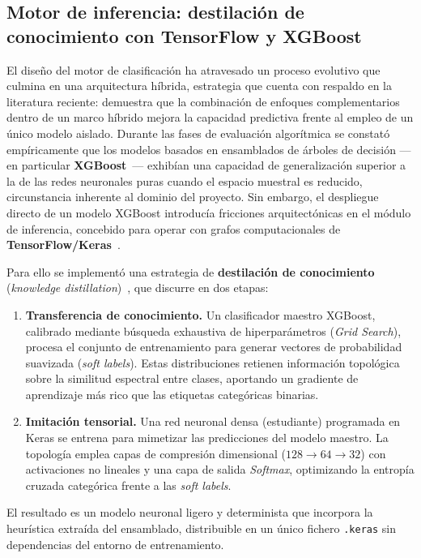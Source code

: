 \subsection{Motor de inferencia: destilación de conocimiento con TensorFlow y XGBoost}

El diseño del motor de clasificación ha atravesado un proceso evolutivo que
culmina en una arquitectura híbrida, estrategia que cuenta con respaldo en la
literatura reciente: \cite{kashani:2025} demuestra que la combinación de
enfoques complementarios dentro de un marco híbrido mejora la capacidad
predictiva frente al empleo de un único modelo aislado. Durante las fases de
evaluación algorítmica se constató empíricamente que los modelos basados en
ensamblados de árboles de decisión ---en particular \textbf{XGBoost}~\cite{chen2016xgboost}---
exhibían una capacidad de generalización superior a la de las redes neuronales
puras cuando el espacio muestral es reducido, circunstancia inherente al dominio
del proyecto. Sin embargo, el despliegue directo de un modelo XGBoost introducía
fricciones arquitectónicas en el módulo de inferencia, concebido para operar con
grafos computacionales de \textbf{TensorFlow/Keras}~\cite{tensorflow2024docs}.

Para ello se implementó una estrategia de \textbf{destilación de conocimiento} (\textit{knowledge distillation})~\cite{hinton2015distilling}, que discurre en dos etapas:

\begin{enumerate}
    \item \textbf{Transferencia de conocimiento.} Un clasificador maestro XGBoost, calibrado mediante búsqueda exhaustiva de hiperparámetros (\textit{Grid Search}), procesa el conjunto de entrenamiento para generar vectores de probabilidad suavizada (\textit{soft labels}). Estas distribuciones retienen información topológica sobre la similitud espectral entre clases, aportando un gradiente de aprendizaje más rico que las etiquetas categóricas binarias.
    \item \textbf{Imitación tensorial.} Una red neuronal densa (estudiante) programada en Keras se entrena para mimetizar las predicciones del modelo maestro. La topología emplea capas de compresión dimensional ($128 \rightarrow 64 \rightarrow 32$) con activaciones no lineales y una capa de salida \textit{Softmax}, optimizando la entropía cruzada categórica frente a las \textit{soft labels}.
\end{enumerate}

El resultado es un modelo neuronal ligero y determinista que incorpora la heurística extraída del ensamblado, distribuible en un único fichero \texttt{.keras} sin dependencias del entorno de entrenamiento.

